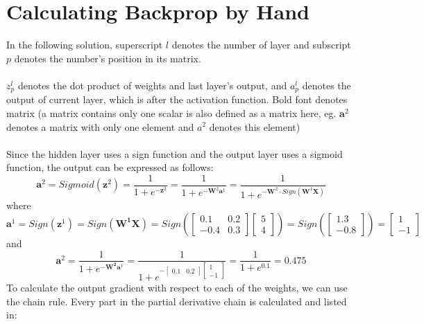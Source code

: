 \documentclass{article}
\begin{document}
    \section{Calculating Backprop by Hand}
    	In the following solution, superscript $l$ denotes the number of layer and subscript $p$ denotes the number's position in its matrix. \\\\
    	$z^l_p$ denotes the dot product of weights and last layer's output, and $a^l_p$ denotes the output of current layer, which is after the activation function. Bold font denotes matrix (a matrix contains only one scalar is also defined as a matrix here, eg. $\boldsymbol{a}^2$ denotes a matrix with only one element and $a^2$  denotes this element)\\\\
    	Since the hidden layer uses a sign function and the output layer uses a sigmoid function, the output can be expressed as follows:
    	$$\boldsymbol{a}^2=
    	Sigmoid(\boldsymbol{z}^2)=
    	\dfrac{1}{1+e^{-\boldsymbol{z}^2}}=
    	\dfrac{1}{1+e^{-\boldsymbol{W}^2\boldsymbol{a}^1}}=
    	\dfrac{1}{1+e^{-\boldsymbol{W}^2\cdot Sign(\boldsymbol{W}^1\boldsymbol{X})}}$$
    	where
    	$$\boldsymbol{a}^1=
    	Sign(\boldsymbol{z}^1)=
    	Sign(\boldsymbol{W^1}\boldsymbol{X})=
    	Sign(\begin{bmatrix}0.1 & 0.2\\-0.4 & 0.3\end{bmatrix} \begin{bmatrix}5\\4\end{bmatrix})=
    	Sign(\begin{bmatrix}1.3\\-0.8\end{bmatrix})=
    	\begin{bmatrix}1\\-1\end{bmatrix}$$
    	and
    	$$\boldsymbol{a}^2=
    	\dfrac{1}{1+e^{-\boldsymbol{W^2}\boldsymbol{a}^1}}=
    	\dfrac{1}{1+e^{-\begin{bmatrix}0.1&0.2\end{bmatrix}\begin{bmatrix}1\\-1\end{bmatrix}}}=
    	\dfrac{1}{1+e^{0.1}}=0.475$$
    	To calculate the output gradient with respect to each of the weights, we can use the chain rule. Every part in the partial derivative chain is calculated and listed in:\\
\end{document}
